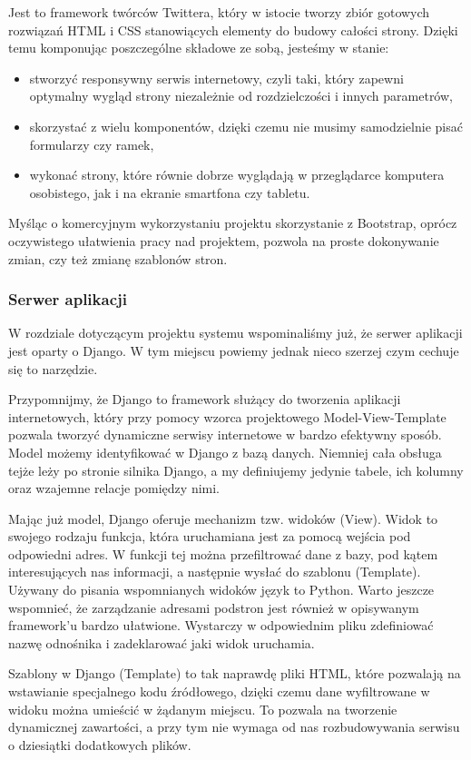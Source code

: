 \documentclass[12pt,titlepage]{article}
\begin{document}
Jest to framework twórców Twittera, który w istocie tworzy zbiór gotowych rozwiązań HTML i CSS stanowiących elementy do budowy całości strony. Dzięki temu komponując poszczególne składowe ze sobą,
jesteśmy w stanie:

\begin{itemize}
 \item stworzyć responsywny serwis internetowy, czyli taki, który zapewni optymalny wygląd strony niezależnie od rozdzielczości i innych parametrów,
 \item skorzystać z wielu komponentów, dzięki czemu nie musimy samodzielnie pisać formularzy czy ramek,
 \item wykonać strony, które równie dobrze wyglądają w przeglądarce komputera osobistego, jak i na ekranie smartfona czy tabletu.
\end{itemize}

Myśląc o komercyjnym wykorzystaniu projektu skorzystanie z Bootstrap, oprócz oczywistego ułatwienia pracy nad projektem, pozwola na proste dokonywanie zmian, 
czy też zmianę szablonów stron.
\subsubsection{Serwer aplikacji}
W rozdziale dotyczącym projektu systemu wspominaliśmy już, że serwer aplikacji jest oparty o Django. W tym miejscu powiemy jednak nieco szerzej czym cechuje się
to narzędzie.

Przypomnijmy, że Django to framework służący do tworzenia aplikacji internetowych, który przy pomocy wzorca projektowego Model-View-Template pozwala tworzyć dynamiczne serwisy
internetowe w bardzo efektywny sposób. Model możemy identyfikować w Django z bazą danych. Niemniej cała obsługa tejże leży po stronie silnika Django, a my definiujemy jedynie
tabele, ich kolumny oraz wzajemne relacje pomiędzy nimi. 

Mając już model, Django oferuje mechanizm tzw. widoków (View). Widok to swojego rodzaju funkcja, która uruchamiana jest za pomocą
wejścia pod odpowiedni adres. W funkcji tej można przefiltrować dane z bazy, pod kątem interesujących nas informacji, a następnie wysłać do szablonu (Template). Używany do pisania wspomnianych widoków
język to Python. Warto jeszcze wspomnieć, że zarządzanie adresami podstron jest również w opisywanym framework'u bardzo ułatwione. Wystarczy w odpowiednim pliku zdefiniować nazwę odnośnika 
i zadeklarować jaki widok uruchamia.

Szablony w Django (Template) to tak naprawdę pliki HTML, które pozwalają na wstawianie specjalnego kodu źródłowego, dzięki czemu dane wyfiltrowane w widoku można umieścić w żądanym miejscu.
To pozwala na tworzenie dynamicznej zawartości, a przy tym nie wymaga od nas rozbudowywania serwisu o dziesiątki dodatkowych plików.
\end{document}
